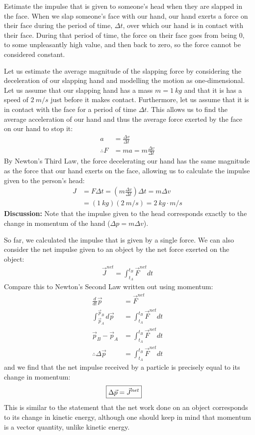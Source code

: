 \begin{example}{Estimate the impulse that is given to someone's head when they are slapped in the face.}
When we slap someone's face with our hand, our hand exerts a force on their face during the period of time, $\Delta t$, over which our hand is in contact with their face. During that period of time, the force on their face goes from being 0, to some unpleasantly high value, and then back to zero, so the force cannot be considered constant. 

Let us estimate the average magnitude of the slapping force by considering the deceleration of our slapping hand and modelling the motion as one-dimensional. Let us assume that our slapping hand has a mass $m=\SI{1}{kg}$ and that it is has a speed of $\SI{2}{m/s}$ just before it makes contact. Furthermore, let us assume that it is in contact with the face for a period of time $\Delta t$. This allows us to find the average acceleration of our hand and thus the average force exerted by the face on our hand to stop it:
\begin{align*}
a &= \frac{\Delta v}{\Delta t}\\
\therefore F &= ma = m  \frac{\Delta v}{\Delta t}
\end{align*}
By Newton's Third Law, the force decelerating our hand has the same magnitude as the force that our hand exerts on the face, allowing us to calculate the impulse given to the person's head:
\begin{align*}
J &= F\Delta t =  \left(m  \frac{\Delta v}{\Delta t}\right) \Delta t = m\Delta v\\
&=(\SI{1}{kg})(\SI{2}{m/s})=\SI{2}{kg\cdot m/s}
\end{align*}
\textbf{Discussion:} Note that the impulse given to the head corresponds exactly to the change in momentum of the hand ($\Delta p=m\Delta v$).
\end{example}

So far, we calculated the impulse that is given by a single force. We can also consider the net impulse given to an object by the net force exerted on the object:
\begin{align*}
\vec J^{net} = \int_{t_A}^{t_B}\vec F^{net} dt
\end{align*}
Compare this to Newton's Second Law written out using momentum:
\begin{align*}
\frac{d}{dt}\vec p &= \vec F^{net}\\
\int_{\vec p_A}^{\vec p_B} d\vec p &=  \int_{t_A}^{t_B}\vec F^{net} dt\\
\vec p_B - \vec p_A &=  \int_{t_A}^{t_B}\vec F^{net}dt\\
\therefore \Delta \vec p &= \int_{t_A}^{t_B}\vec F^{net}	 dt
\end{align*}
and we find that the net impulse received by a particle is precisely equal to its change in momentum:
\begin{align}
\Aboxed{\Delta \vec p = \vec J^{net}}
\end{align}
This is similar to the statement that the net work done on an object corresponds to its change in kinetic energy, although one should keep in mind that momentum is a vector quantity, unlike kinetic energy.

